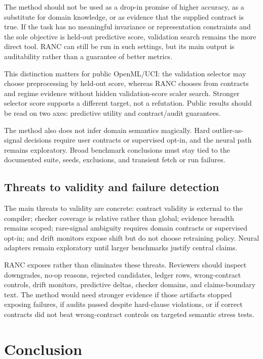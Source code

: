 \documentclass{article}
\begin{document}
The method should not be used as a drop-in promise of higher accuracy, as a
substitute for domain knowledge, or as evidence that the supplied contract is
true. If the task has no meaningful invariance or representation constraints and
the sole objective is held-out predictive score, validation search remains the
more direct tool. RANC can still be run in such settings, but its main output is
auditability rather than a guarantee of better metrics.

This distinction matters for public OpenML/UCI: the validation selector may
choose preprocessing by held-out score, whereas RANC chooses from contracts and
regime evidence without hidden validation-score scaler search. Stronger selector
score supports a different target, not a refutation. Public results should be
read on two axes: predictive utility and contract/audit guarantees.

The method also does not infer domain semantics magically. Hard outlier-as-signal
decisions require user contracts or supervised opt-in, and the neural path
remains exploratory. Broad benchmark conclusions must stay tied to the
documented suite, seeds, exclusions, and transient fetch or run failures.

\subsection{Threats to validity and failure detection}

The main threats to validity are concrete: contract validity is external to the
compiler; checker coverage is relative rather than global; evidence breadth
remains scoped; rare-signal ambiguity requires domain contracts or supervised
opt-in; and drift monitors expose shift but do not choose retraining policy.
Neural adapters remain exploratory until larger benchmarks justify central
claims.

RANC exposes rather than eliminates these threats. Reviewers should inspect
downgrades, no-op reasons, rejected candidates, ledger rows, wrong-contract
controls, drift monitors, predictive deltas, checker domains, and
claims-boundary text. The method would need stronger evidence if those artifacts
stopped exposing failures, if audits passed despite hard-clause violations, or
if correct contracts did not beat wrong-contract controls on targeted semantic
stress tests.

\section{Conclusion}
\end{document}
